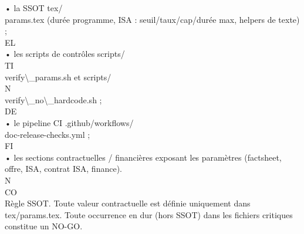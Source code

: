 \documentclass[12pt,landscape,a4paper]{article}
\begin{document}
\vspace{0.5em}
• la SSOT tex/\\
\vspace{0.5em}
params.tex (durée programme, ISA : seuil/taux/cap/durée max, helpers de texte) ;\\
\vspace{0.5em}
\vspace{0.5em}
\vspace{0.5em}
\vspace{0.5em}
EL\\
• les scripts de contrôles scripts/\\
\vspace{0.5em}
\vspace{0.5em}
\vspace{0.5em}
\vspace{0.5em}
TI\\
verify\textbackslash{}_params.sh et scripts/\\
\vspace{0.5em}
\vspace{0.5em}
\vspace{0.5em}
\vspace{0.5em}
N\\
verify\textbackslash{}_no\textbackslash{}_hardcode.sh ;\\
\vspace{0.5em}
\vspace{0.5em}
\vspace{0.5em}
\vspace{0.5em}
DE\\
• le pipeline CI .github/workflows/\\
\vspace{0.5em}
doc-release-checks.yml ;\\
\vspace{0.5em}
\vspace{0.5em}
\vspace{0.5em}
\vspace{0.5em}
FI\\
• les sections contractuelles / financières exposant les paramètres (factsheet, offre, ISA, contrat ISA, finance).\\
\vspace{0.5em}
\vspace{0.5em}
\vspace{0.5em}
N\\
CO\\
Règle SSOT. Toute valeur contractuelle est définie uniquement dans tex/params.tex. Toute occurrence en dur (hors SSOT) dans les fichiers critiques constitue un NO-GO.\\
\end{document}
